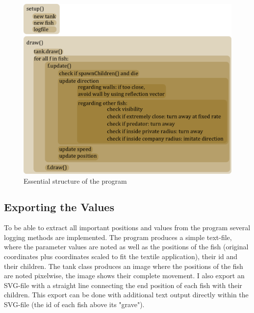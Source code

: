 \documentclass{scrartcl}
\begin{document}
\begin{figure}[h]
        \centering
        \includegraphics[width=\textwidth]{implementationsketch}
        \caption{Essential structure of the program}
        
\end{figure}

\subsection{Exporting the Values}
To be able to extract all important positions and values from the program several logging methods are implemented. The program produces a simple text-file, where the parameter values are noted as well as the positions of the fish (original coordinates plus coordinates scaled to fit the textile application), their id and their children. The tank class produces an image where the positions of the fish are noted pixelwise, the image shows their complete movement. I also export an SVG-file with a straight line connecting the end position of each fish with their children. This export can be done with additional text output directly within the SVG-file (the id of each fish above its "grave").
\end{document}
